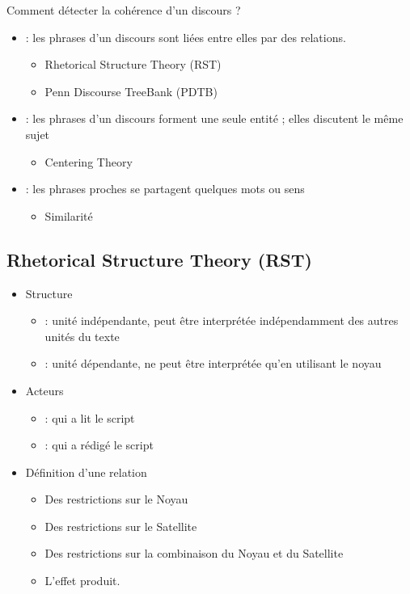 \documentclass{KodeBook}
\begin{document}
Comment détecter la cohérence d'un discours ?
\begin{itemize}
	\item {} : les phrases d'un discours sont liées entre elles par des relations. 
	\begin{itemize}
		\item Rhetorical Structure Theory (RST) 
		\item Penn Discourse TreeBank (PDTB)
	\end{itemize}
	\item {} : les phrases d'un discours forment une seule entité ; elles discutent le même sujet
	\begin{itemize}
		\item Centering Theory 
	\end{itemize}
	\item {} : les phrases proches se partagent quelques mots ou sens 
	\begin{itemize}
		\item Similarité
	\end{itemize}
\end{itemize}

\subsection{Rhetorical Structure Theory (RST)}

\begin{itemize}
	\item Structure  
	\begin{itemize}
		\item {} :  unité indépendante, peut être interprétée indépendamment des autres unités du texte
		\item {} :  unité dépendante, ne peut être interprétée qu'en utilisant le noyau
	\end{itemize}
	\item Acteurs
	\begin{itemize}
		\item {} :  qui a lit le script
		\item {} :  qui a rédigé le script
	\end{itemize}
	\item Définition d'une relation
	\begin{itemize}
		\item Des restrictions sur le Noyau 
		\item Des restrictions sur le Satellite 
		\item Des restrictions sur la combinaison du Noyau et du Satellite 
		\item L'effet produit.
	\end{itemize}
\end{itemize}
\end{document}
